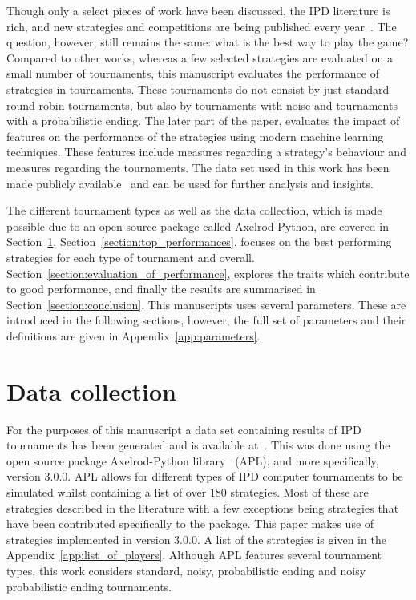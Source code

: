 \documentclass{article}
\newcommand{\numberofalltournaments}{}
\newcommand{\numberofstrategies}{}
\begin{document}
Though only a select pieces of work have been discussed, the IPD literature is
rich, and new strategies and competitions are being published every year~\cite{Glynatsi2019}. The
question, however, still remains the same: what is the best way to play the
game? Compared to other works, whereas a few selected strategies are evaluated
on a small number of tournaments, this manuscript evaluates the performance of \numberofstrategies
strategies in \numberofalltournaments tournaments. These tournaments do not
consist by just standard round robin tournaments, but also by tournaments with noise
and tournaments with a probabilistic ending. The later part of the paper, evaluates
the impact of features on the performance of the strategies using modern
machine learning techniques. These features include measures regarding a
strategy's behaviour and measures regarding the tournaments. The data set used
in this work has been made publicly available~\cite{data} and can be used
for further analysis and insights.

The different tournament types as well as the data collection, which is made
possible due to an open source package called Axelrod-Python,
are covered in Section~\ref{section:data_collection}.
Section~\ref{section:top_performances}, focuses on the best performing
strategies for each type of tournament and overall.
Section~\ref{section:evaluation_of_performance}, explores the traits which
contribute to good performance, and finally the results are summarised in
Section~\ref{section:conclusion}. This manuscripts uses several parameters.
These are introduced in the following sections, however, the full set of
parameters and their definitions are given in Appendix~\ref{app:parameters}.

\section{Data collection}\label{section:data_collection}

For the purposes of this manuscript a data set containing results of IPD
tournaments has been generated and is available at~\cite{data}. This was done using the
open source package Axelrod-Python library~\cite{axelrodproject} (APL), and more specifically,
version 3.0.0. APL allows for different types of IPD computer
tournaments to be simulated whilst containing a list of over 180 strategies.
Most of these are strategies described in the literature with a few exceptions
being strategies that have been contributed specifically to the package. This
paper makes use of \numberofstrategies strategies implemented in version 3.0.0. A
list of the strategies is given in the Appendix~\ref{app:list_of_players}.
Although APL features several tournament types, this work considers
standard, noisy, probabilistic ending and noisy probabilistic ending
tournaments.
\end{document}
